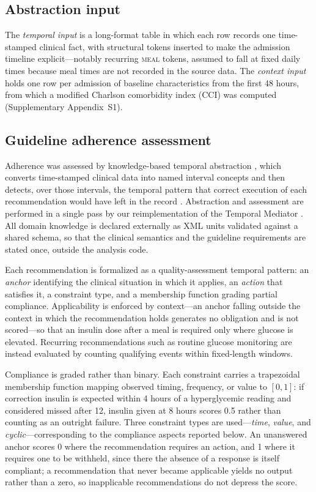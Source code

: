 \subsection{Abstraction input}

The \emph{temporal input} is a long-format table in which each row records one
time-stamped clinical fact, with structural tokens inserted to make the
admission timeline explicit---notably recurring \textsc{meal} tokens, assumed
to fall at fixed daily times because meal times are not recorded in the source
data. The \emph{context input} holds one row per admission of baseline
characteristics from the first 48 hours, from which a modified Charlson
comorbidity index (CCI) was computed (Supplementary Appendix~S1).

\subsection{Guideline adherence assessment}

Adherence was assessed by knowledge-based temporal abstraction
\citep{shahar1997framework}, which converts time-stamped clinical data into
named interval concepts and then detects, over those intervals, the temporal
pattern that correct execution of each recommendation would have left in the
record \citep{ben2024supporting}. Abstraction and assessment are performed in a
single pass by our reimplementation of the Temporal Mediator
\citep{mediator-github}. All domain knowledge is declared externally as XML
units validated against a shared schema, so that the clinical semantics and the
guideline requirements are stated once, outside the analysis code.

Each recommendation is formalized as a quality-assessment temporal pattern: an
\emph{anchor} identifying the clinical situation in which it applies, an
\emph{action} that satisfies it, a constraint type, and a membership function
grading partial compliance. Applicability is enforced by context---an anchor
falling outside the context in which the recommendation holds generates no
obligation and is not scored---so that an insulin dose after a meal is required
only where glucose is elevated. Recurring recommendations such as routine
glucose monitoring are instead evaluated by counting qualifying events within
fixed-length windows.

Compliance is graded rather than binary. Each constraint carries a trapezoidal
membership function mapping observed timing, frequency, or value to $[0,1]$: if
correction insulin is expected within 4 hours of a hyperglycemic reading and
considered missed after 12, insulin given at 8 hours scores 0.5 rather than
counting as an outright failure. Three constraint types are
used---\emph{time}, \emph{value}, and \emph{cyclic}---corresponding to the
compliance aspects reported below. An unanswered anchor
scores 0 where the recommendation requires an action, and 1 where it requires
one to be withheld, since there the absence of a response is itself compliant;
a recommendation that never became applicable yields no output rather than a
zero, so inapplicable recommendations do not depress the score.

